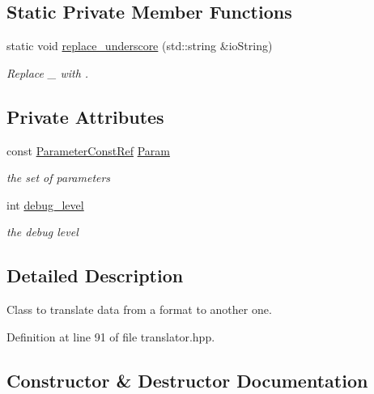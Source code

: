 \subsection*{Static Private Member Functions}
\begin{DoxyCompactItemize}
\item 
static void \hyperlink{classTranslator_ae281dabc048b77d9527fad9374e0d9cc}{replace\+\_\+underscore} (std\+::string \&io\+String)
\begin{DoxyCompactList}\small\item\em Replace \textquotesingle{}\+\_\+\textquotesingle{} with \textquotesingle{} \textquotesingle{}. \end{DoxyCompactList}\end{DoxyCompactItemize}
\subsection*{Private Attributes}
\begin{DoxyCompactItemize}
\item 
const \hyperlink{Parameter_8hpp_a37841774a6fcb479b597fdf8955eb4ea}{Parameter\+Const\+Ref} \hyperlink{classTranslator_a3488e803db68b5e706c6d6a7bdadb25f}{Param}
\begin{DoxyCompactList}\small\item\em the set of parameters \end{DoxyCompactList}\item 
int \hyperlink{classTranslator_abc7b43c3a408d5193949347330bddc80}{debug\+\_\+level}
\begin{DoxyCompactList}\small\item\em the debug level \end{DoxyCompactList}\end{DoxyCompactItemize}


\subsection{Detailed Description}
Class to translate data from a format to another one. 

Definition at line 91 of file translator.\+hpp.



\subsection{Constructor \& Destructor Documentation}
\mbox{\label{classTranslator_a691eb72bfdf08e15506969d5cba6a400}} 
